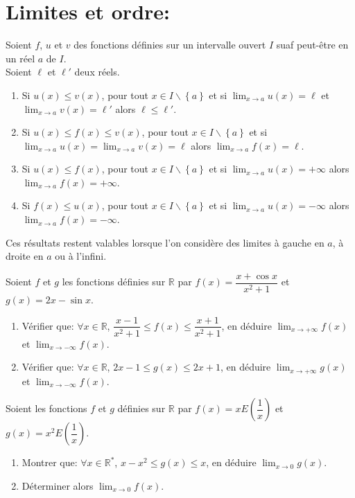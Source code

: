 \documentclass[12pt,a4paper,x11names,usenames,dvipsnames,svgnames,oneside]{book}
\def\skn{\tcbsubskin{skn}{empty}{frame code={%
}}}
\newenvironment{rem}{\skn\boxxr\tcbtitle}{\endboxxr}
\def\skn{\tcbsubskin{skn}{empty}{frame code={%
}}}
\def\R{\mathbb{R}}
\begin{document}
\section{Limites et ordre:}
\begin{thr}
Soient $f$, $u$ et $v$ des fonctions définies sur un intervalle ouvert $I$ suaf peut-être en un réel $a$ de $I$.\\
Soient $\ell$ et $\ell'$ deux réels.
\begin{enumerate}
\item Si $u(x) \leqslant v(x)$, pour tout $x\in I\backslash \left\{ a \right\}$ et si $\lim_{x\to a} u(x)=\ell$ et $\lim_{x\to a}v(x)=\ell'$ alors $\ell \leqslant \ell'$.
\item Si $u(x) \leqslant f(x) \leqslant v(x)$, pour tout $x\in I\backslash \left\{ a \right\}$ et si $\lim_{x\to a}u(x)=\lim_{x\to a}v(x)=\ell$ alors $\lim_{x\to a}f(x)=\ell$.
\item Si $u(x)  \leqslant f(x)$, pour tout $x\in I\backslash \left\{ a \right\}$ et si $\lim_{x\to a}u(x)=+\infty$ alors $\lim_{x\to a}f(x)=+\infty$.
\item Si $f(x) \leqslant u(x)$, pour tout $x\in I\backslash \left\{ a \right\}$ et si $\lim_{x\to a}u(x)=-\infty$ alors $\lim_{x\to a}f(x)=-\infty$.
\end{enumerate}
\end{thr}
\begin{rem}
Ces résultats restent valables lorsque l'on considère des limites à gauche en $a$, à droite en $a$ ou à l'infini.
\end{rem}
\begin{dem}
\end{dem}
\begin{exr}
Soient $f$ et $g$ les fonctions définies sur $\R$ par $f(x)=\dfrac{x+\cos x}{x^2+1}$ et $g(x)=2x-\sin x$.
\begin{enumerate}
\item Vérifier que: $\forall x\in\R$, $\dfrac{x-1}{x^2+1} \leqslant f(x) \leqslant \dfrac{x+1}{x^2+1}$, en déduire $\lim_{x\to+\infty}f(x)$ et $\lim_{x\to-\infty}f(x)$.
\item Vérifier que: $\forall x\in\R$, $2x-1 \leqslant g(x) \leqslant 2x+1$, en déduire $\lim_{x\to+\infty}g(x)$ et $\lim_{x\to-\infty}f(x)$.
\end{enumerate}
\end{exr}
\begin{exr}
Soient les fonctions $f$ et $g$ définies sur $\R$ par $f(x)=xE\left(\dfrac{1}{x}\right)$ et $g(x)=x^2E\left(\dfrac{1}{x}\right)$.
\begin{enumerate}
\item Montrer que: $\forall x\in\R^*$, $x-x^2 \leqslant g(x) \leqslant x$, en déduire $\lim_{x\to 0}g(x)$.
\item Déterminer alors $\lim_{x\to 0}f(x)$.
\end{enumerate}
\end{exr}
\end{document}
